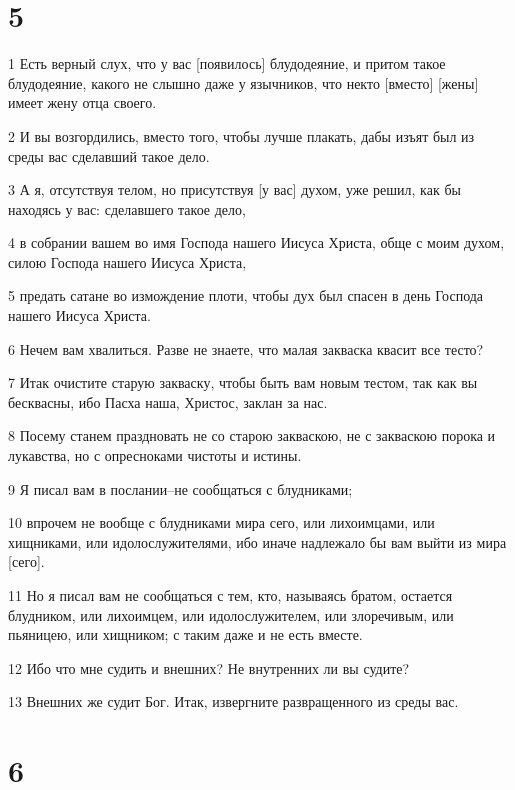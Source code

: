 \chapter{5}

\par 1 Есть верный слух, что у вас [появилось] блудодеяние, и притом такое блудодеяние, какого не слышно даже у язычников, что некто [вместо] [жены] имеет жену отца своего.
\par 2 И вы возгордились, вместо того, чтобы лучше плакать, дабы изъят был из среды вас сделавший такое дело.
\par 3 А я, отсутствуя телом, но присутствуя [у вас] духом, уже решил, как бы находясь у вас: сделавшего такое дело,
\par 4 в собрании вашем во имя Господа нашего Иисуса Христа, обще с моим духом, силою Господа нашего Иисуса Христа,
\par 5 предать сатане во измождение плоти, чтобы дух был спасен в день Господа нашего Иисуса Христа.
\par 6 Нечем вам хвалиться. Разве не знаете, что малая закваска квасит все тесто?
\par 7 Итак очистите старую закваску, чтобы быть вам новым тестом, так как вы бесквасны, ибо Пасха наша, Христос, заклан за нас.
\par 8 Посему станем праздновать не со старою закваскою, не с закваскою порока и лукавства, но с опресноками чистоты и истины.
\par 9 Я писал вам в послании--не сообщаться с блудниками;
\par 10 впрочем не вообще с блудниками мира сего, или лихоимцами, или хищниками, или идолослужителями, ибо иначе надлежало бы вам выйти из мира [сего].
\par 11 Но я писал вам не сообщаться с тем, кто, называясь братом, остается блудником, или лихоимцем, или идолослужителем, или злоречивым, или пьяницею, или хищником; с таким даже и не есть вместе.
\par 12 Ибо что мне судить и внешних? Не внутренних ли вы судите?
\par 13 Внешних же судит Бог. Итак, извергните развращенного из среды вас.

\chapter{6}

